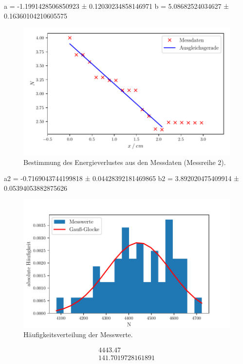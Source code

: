 a = -1.1991428506850923 ± 0.12030234858146971
b = 5.08682524034627 ± 0.16360104210605575

\begin{figure}[H]
  \centering
  \includegraphics[width=\textwidth]{build/plot4.pdf}
  \caption {Bestimmung des Energieverlustes aus den Messdaten (Messreihe 2).}
  \label{fig:plot4}
\end{figure}


a2 = -0.7169043744199818 ± 0.04428392181469865
b2 = 3.892020475409914 ± 0.05394053882875626


\begin{figure}[H]
  \centering
  \includegraphics[width=\textwidth]{build/gauss.pdf}
  \caption {Häufigkeitsverteilung der Messwerte.}
  \label{fig:gauss}
\end{figure}
\begin{align*}
  4443.47\\
   141.7019728161891
\end{align*}

